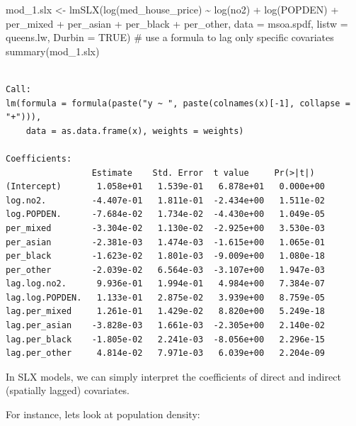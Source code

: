 \documentclass[
  letterpaper,
  DIV=11,
  numbers=noendperiod]{scrreprt}
\newenvironment{Shaded}{\begin{snugshade}}{\end{snugshade}}
\newcommand{\AttributeTok}[1]{\textcolor[rgb]{0.40,0.45,0.13}{#1}}
\newcommand{\CommentTok}[1]{\textcolor[rgb]{0.37,0.37,0.37}{#1}}
\newcommand{\ConstantTok}[1]{\textcolor[rgb]{0.56,0.35,0.01}{#1}}
\newcommand{\FunctionTok}[1]{\textcolor[rgb]{0.28,0.35,0.67}{#1}}
\newcommand{\NormalTok}[1]{\textcolor[rgb]{0.00,0.23,0.31}{#1}}
\newcommand{\OtherTok}[1]{\textcolor[rgb]{0.00,0.23,0.31}{#1}}
\newcommand{\SpecialCharTok}[1]{\textcolor[rgb]{0.37,0.37,0.37}{#1}}
\begin{document}
\begin{Shaded}
\begin{Highlighting}[]
\NormalTok{mod\_1.slx }\OtherTok{\textless{}{-}} \FunctionTok{lmSLX}\NormalTok{(}\FunctionTok{log}\NormalTok{(med\_house\_price) }\SpecialCharTok{\textasciitilde{}} \FunctionTok{log}\NormalTok{(no2) }\SpecialCharTok{+} \FunctionTok{log}\NormalTok{(POPDEN) }\SpecialCharTok{+} 
\NormalTok{                     per\_mixed }\SpecialCharTok{+}\NormalTok{ per\_asian }\SpecialCharTok{+}\NormalTok{ per\_black }\SpecialCharTok{+}\NormalTok{ per\_other,  }
                   \AttributeTok{data =}\NormalTok{ msoa.spdf, }
                   \AttributeTok{listw =}\NormalTok{ queens.lw, }
                   \AttributeTok{Durbin =} \ConstantTok{TRUE}\NormalTok{) }\CommentTok{\# use a formula to lag only specific covariates}
\FunctionTok{summary}\NormalTok{(mod\_1.slx)}
\end{Highlighting}
\end{Shaded}

\begin{verbatim}

Call:
lm(formula = formula(paste("y ~ ", paste(colnames(x)[-1], collapse = "+"))), 
    data = as.data.frame(x), weights = weights)

Coefficients:
                 Estimate    Std. Error  t value     Pr(>|t|)  
(Intercept)       1.058e+01   1.539e-01   6.878e+01   0.000e+00
log.no2.         -4.407e-01   1.811e-01  -2.434e+00   1.511e-02
log.POPDEN.      -7.684e-02   1.734e-02  -4.430e+00   1.049e-05
per_mixed        -3.304e-02   1.130e-02  -2.925e+00   3.530e-03
per_asian        -2.381e-03   1.474e-03  -1.615e+00   1.065e-01
per_black        -1.623e-02   1.801e-03  -9.009e+00   1.080e-18
per_other        -2.039e-02   6.564e-03  -3.107e+00   1.947e-03
lag.log.no2.      9.936e-01   1.994e-01   4.984e+00   7.384e-07
lag.log.POPDEN.   1.133e-01   2.875e-02   3.939e+00   8.759e-05
lag.per_mixed     1.261e-01   1.429e-02   8.820e+00   5.249e-18
lag.per_asian    -3.828e-03   1.661e-03  -2.305e+00   2.140e-02
lag.per_black    -1.805e-02   2.241e-03  -8.056e+00   2.296e-15
lag.per_other     4.814e-02   7.971e-03   6.039e+00   2.204e-09
\end{verbatim}

In SLX models, we can simply interpret the coefficients of direct and
indirect (spatially lagged) covariates.

For instance, lets look at population density:
\end{document}
